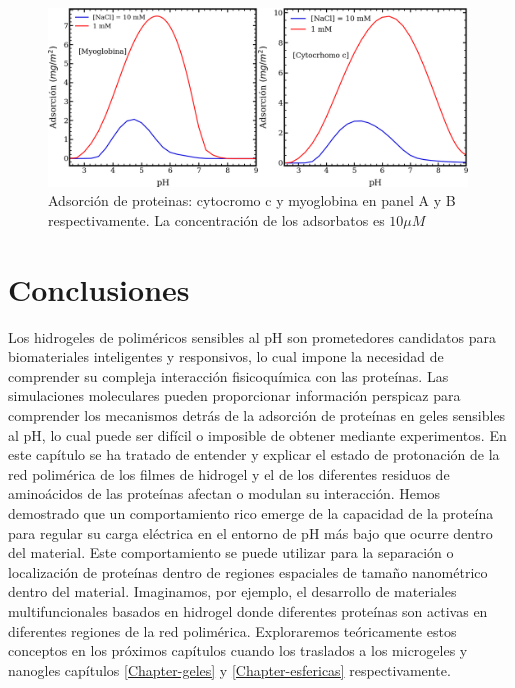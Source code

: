 \begin{figure}
    \centering
    \includegraphics[width=0.99\textwidth]{Figures/graph-film/ad-proteins.png}
    \caption{Adsorci\'on de proteinas: cytocromo c y myoglobina en panel A y B respectivamente. La concentraci\'on de los adsorbatos es $10 \mu M$}
    \label{fig:film:ad-pro}
\end{figure}


\section{Conclusiones}


Los hidrogeles de polim\'ericos sensibles al pH son prometedores candidatos para biomateriales inteligentes y responsivos, lo cual impone la necesidad de comprender su compleja interacción fisicoqu\'imica con las prote\'inas. Las simulaciones moleculares pueden proporcionar informaci\'on perspicaz para comprender los mecanismos detr\'as de la adsorci\'on de prote\'inas en geles sensibles al pH, lo cual puede ser dif\'icil o imposible de obtener mediante experimentos. En este cap\'itulo se ha tratado de  entender y explicar el estado de protonaci\'on de la red polim\'erica de los filmes de hidrogel y el de los diferentes residuos de amino\'acidos de las prote\'inas afectan o modulan su interacci\'on. Hemos demostrado que un comportamiento rico emerge de la capacidad de la prote\'ina para regular su carga el\'ectrica en el entorno de pH m\'as bajo que ocurre dentro del material. Este comportamiento se puede utilizar para la separaci\'on o localizaci\'on de prote\'inas dentro de regiones espaciales de tama\~no nanom\'etrico dentro del material. Imaginamos, por ejemplo, el desarrollo de materiales multifuncionales basados en hidrogel donde diferentes proteínas son activas en diferentes regiones de la red polim\'erica. Exploraremos te\'oricamente estos conceptos en los pr\'oximos cap\'itulos cuando los traslados a los microgeles y nanogles cap\'itulos  \ref{Chapter-geles}  y \ref{Chapter-esfericas} respectivamente.
